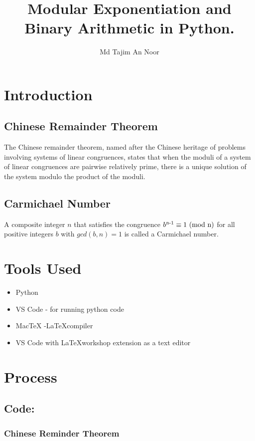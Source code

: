 \documentclass[12pt]{article}
\title{Modular Exponentiation and Binary Arithmetic in Python.}
\author{Md Tajim An Noor}
\date{}
\begin{document}

\pagebreak

\tableofcontents

\maketitle
\section{Introduction}


\subsection{Chinese Remainder Theorem}
The Chinese remainder theorem, named after the Chinese heritage of problems involving systems of linear congruences, states that when the moduli of a system of linear congruences are pairwise relatively prime, there is a unique solution of the system modulo the product of the moduli.


\subsection{Carmichael Number}
A composite integer $n$ that satisfies the congruence $b\textsuperscript{n-1}\equiv1\text{ (mod n)}$ for all positive integers $b$ with $gcd(b, n) = 1$ is called a Carmichael number.\cite{rosenDiscrete}


\section{Tools Used}
\begin{itemize}
    \item Python
    \item VS Code - for running python code
    \item MacTeX -\LaTeX  compiler
    \item VS Code with \LaTeX workshop extension as a text editor
\end{itemize}

\section{Process}

\subsection{Code:}
\subsubsection{Chinese Reminder Theorem}
\inputminted[breaklines,linenos]{python3}{codes/chineseRem.py}
\vspace*{40mm}
\end{document}
